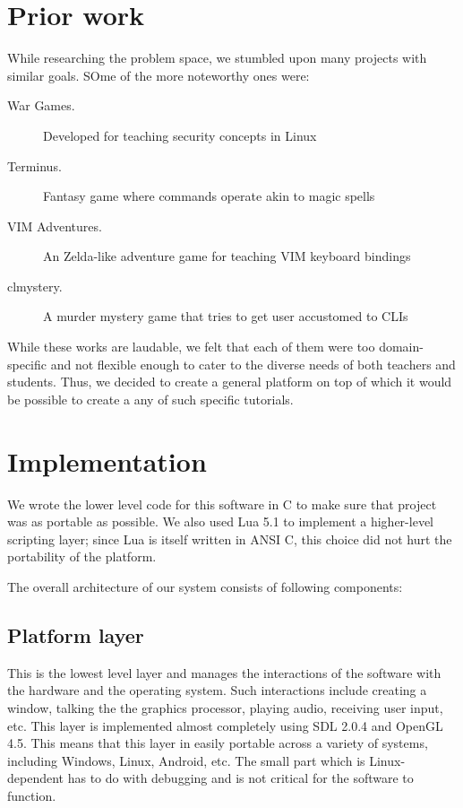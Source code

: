 \documentclass[a4paper]{article}
\begin{document}
\section{Prior work}
While researching the problem space, we stumbled upon many projects with similar goals. SOme of the more noteworthy ones were:
\begin{description}
    \item [\quad\quad\quad War Games.] Developed for teaching security concepts in Linux \cite{wargames}
    \item [\quad\quad\quad Terminus.] Fantasy game where commands operate akin to magic spells \cite{terminus}
    \item [\quad\quad\quad VIM Adventures.] An Zelda-like adventure game for teaching VIM keyboard bindings \cite{vimadvent}
    \item [\quad\quad\quad clmystery.] A murder mystery game that tries to get user accustomed to CLIs \cite{clmystery}
\end{description}

While these works are laudable, we felt that each of them were too domain-specific and not flexible enough to cater to the diverse needs of both teachers and students. Thus, we decided to create a general platform on top of which it would be possible to create a any of such specific tutorials.

\section{Implementation}
We wrote the lower level code for this software in C to make sure that project was as portable as possible. We also used Lua 5.1\cite{lua} to implement a higher-level scripting layer; since Lua is itself written in ANSI C, this choice did not hurt the portability of the platform.

The overall architecture of our system consists of following components:

\subsection{Platform layer}
This is the lowest level layer and manages the interactions of the software with the hardware and the operating system. Such interactions include creating a window, talking the the graphics processor, playing audio, receiving user input, etc. This layer is implemented almost completely using SDL 2.0.4\cite{sdl} and OpenGL 4.5\cite{opengl}. This means that this layer in easily portable across a variety of systems, including Windows, Linux, Android, etc. The small part which is Linux-dependent has to do with debugging and is not critical for the software to function.
\end{document}
